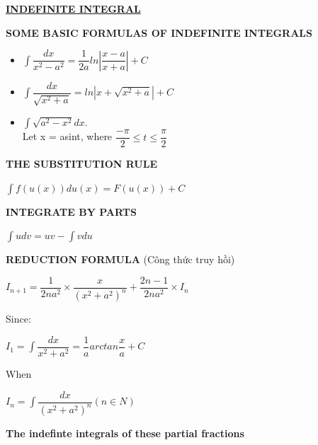 \documentclass[10pt]{article}
\begin{document}
\begin{center}
\textbf{\underline{INDEFINITE INTEGRAL}}
\end{center}
\textbf{SOME BASIC FORMULAS OF INDEFINITE INTEGRALS}
\begin{itemize}
	\item $\displaystyle \int \dfrac{dx}{x^2-a^2} = \dfrac{1}{2a}ln|\dfrac{x-a}{x+a}| + C$
	\item $\displaystyle \int \dfrac{dx}{\sqrt{x^2 +a}} = ln|x+ \sqrt{x^2 +a}| + C$
	\item $\displaystyle \int \sqrt{a^2-x^2}dx$.\\
	Let x = asint, where $\dfrac{- \pi}{2} \le t \le \dfrac{\pi}{2}$
\end{itemize}
\textbf{THE SUBSTITUTION RULE }
\begin{mybox}
\begin{center}
$\displaystyle \int f(u(x))du(x)= F(u(x))+C$
\end{center}
\end{mybox}
\textbf{INTEGRATE BY PARTS}
\begin{mybox}
\begin{center}
$\displaystyle \int udv = uv- \int vdu$
\end{center}
\end{mybox}
\textbf{REDUCTION FORMULA} (Công thức truy hồi)
\begin{mybox}
\begin{center}
$I_{n+1} = \dfrac{1}{2na^2} \times \dfrac{x}{(x^2+a^2)^n} + \dfrac{2n-1}{2na^2} \times I_n$
\end{center}
\end{mybox}
Since:\\
\begin{center}
$I_1= \displaystyle \int \dfrac{dx}{x^2+a^2} = \dfrac{1}{a}arctan \dfrac{x}{a}+C$
\end{center}
When\\
\begin{mybox}
\begin{center}
$I_n = \displaystyle \int \dfrac{dx}{(x^2+a^2)^n} (n \in N)$
\end{center}
\end{mybox}
\textbf{The indefinte integrals of these partial fractions}
\end{document}
